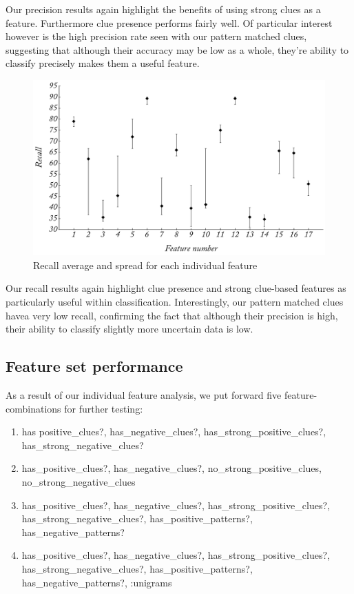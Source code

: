 Our precision results again highlight the benefits of using strong clues as a feature. Furthermore clue presence performs fairly well. Of particular interest however is the high precision rate seen with our pattern matched clues, suggesting that although their accuracy may be low as a whole, they're ability to classify precisely makes them a useful feature.

\begin{figure}
	\caption{Recall average and spread for each individual feature}
	\label{fig:polarity_r}
	\centering
		\includegraphics[width=1.0\textwidth]{graphs/polarity_r.pdf}
\end{figure}

Our recall results again highlight clue presence and strong clue-based features as particularly useful within classification. Interestingly, our pattern matched clues havea very low recall, confirming the fact that although their precision is high, their ability to classify slightly more uncertain data is low.

\subsection{Feature set performance}
\label{polarity:feature_set}

As a result of our individual feature analysis, we put forward five feature-combinations for further testing:

\begin{enumerate}
    \item has
		positive\-\_clues?, has\-\_negative\-\_clues?, has\-\_strong\-\_positive\-\_clues?, has\-\_strong\-\_negative\-\_clues?
    \item has\-\_positive\-\_clues?, has\-\_negative\-\_clues?, no\-\_strong\-\_positive\-\_clues, no\-\_strong\-\_negative\-\_clues
		\item has\-\_positive\-\_clues?, has\-\_negative\-\_clues?, has\-\_strong\-\_positive\-\_clues?, has\-\_strong\-\_negative\-\_clues?, has\-\_positive\-\_patterns?, has\-\_negative\-\_patterns?
		\item has\-\_positive\-\_clues?, has\-\_negative\-\_clues?, has\-\_strong\-\_positive\-\_clues?, has\-\_strong\-\_negative\-\_clues?, has\-\_positive\-\_patterns?, has\-\_negative\-\_patterns?, :unigrams
\end{enumerate}

